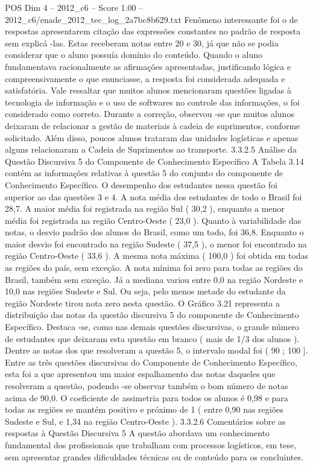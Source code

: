 \begin{textsample}{POS Dim 4 – 2012\_c6 – Score 1.00 – 2012\_c6/enade\_2012\_tec\_log\_2a7bc8b629.txt}
Fenômeno interessante foi o de respostas apresentarem citação das expressões constantes no padrão de resposta sem explicá -las.
Estas receberam notas entre 20 e 30, já que não se podia considerar que o aluno possuía domínio do conteúdo.
Quando o aluno fundamentava racionalmente as afirmações apresentadas, justificando lógica e compreensivamente o que enunciasse, a resposta foi considerada adequada e satisfatória.
Vale ressaltar que muitos alunos mencionaram questões ligadas à tecnologia de informação e o uso de softwares no controle das informações, o foi considerado como correto.
Durante a correção, observou -se que muitos alunos deixaram de relacionar a gestão de materiais à cadeia de suprimentos, conforme solicitado.
Além disso, poucos alunos trataram das unidades logísticas e apenas alguns relacionaram a Cadeia de Suprimentos ao transporte. 3.3.2.5 Análise da Questão Discursiva 5 do Componente de Conhecimento Específico A Tabela 3.14 contém as informações relativas à questão 5 do conjunto do componente de Conhecimento Específico.
O desempenho dos estudantes nessa questão foi superior ao das questões 3 e 4.
A nota média dos estudantes de todo o Brasil foi 28,7.
A maior média foi registrada na região Sul ( 30,2 ), enquanto a menor média foi registrada na região Centro-Oeste ( 23,0 ).
Quanto à variabilidade das notas, o desvio padrão dos alunos do Brasil, como um todo, foi 36,8.
Enquanto o maior desvio foi encontrado na região Sudeste ( 37,5 ), o menor foi encontrado na região Centro-Oeste ( 33,6 ).
A mesma nota máxima ( 100,0 ) foi obtida em todas as regiões do país, sem exceção.
A nota mínima foi zero para todas as regiões do Brasil, também sem exceção.
Já a mediana variou entre 0,0 na região Nordeste e 10,0 nas regiões Sudeste e Sul.
Ou seja, pelo menos metade do estudante da região Nordeste tirou nota zero nesta questão.
O Gráfico 3.21 representa a distribuição das notas da questão discursiva 5 do componente de Conhecimento Específico.
Destaca -se, como nas demais questões discursivas, o grande número de estudantes que deixaram esta questão em branco ( mais de 1/3 dos alunos ).
Dentre as notas dos que resolveram a questão 5, o intervalo modal foi ( 90 ; 100 ].
Entre as três questões discursivas do Componente de Conhecimento Específico, esta foi a que apresentou um maior espalhamento das notas daqueles que resolveram a questão, podendo -se observar também o bom número de notas acima de 90,0.
O coeficiente de assimetria para todos os alunos é 0,98 e para todas as regiões se mantém positivo e próximo de 1 ( entre 0,90 nas regiões Sudeste e Sul, e 1,34 na região Centro-Oeste ). 3.3.2.6 Comentários sobre as respostas à Questão Discursiva 5 A questão abordava um conhecimento fundamental dos profissionais que trabalham com processos logísticos, em tese, sem apresentar grandes dificuldades técnicas ou de conteúdo para os concluintes.

\end{textsample}
